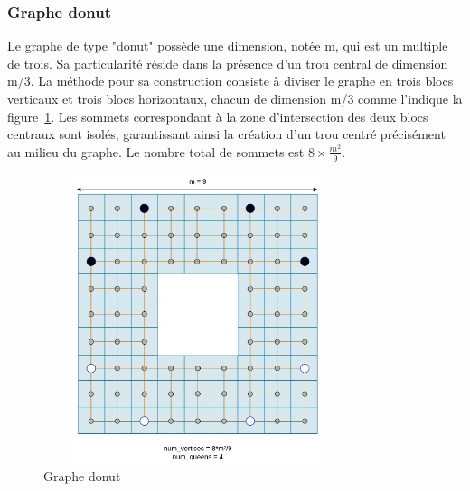 \documentclass[11pt]{article}
\begin{document}
            \subsubsection{Graphe donut}
            Le graphe de type "donut" possède une dimension, notée m, qui est un multiple de trois. Sa particularité réside dans la présence d'un trou central de dimension m/3. La méthode pour sa construction consiste à diviser le graphe en trois blocs verticaux et trois blocs horizontaux, chacun de dimension m/3 comme l'indique la figure~\ref{fig:graphd}. Les sommets correspondant à la zone d'intersection des deux blocs centraux sont isolés, garantissant ainsi la création d'un trou centré précisément au milieu du graphe. Le nombre total de sommets est $8\times \frac{m^{2}}{9}$.
            \begin{figure}[h]
                \centering
                \includegraphics[width = 9cm, height = 8.5cm]{graphe_donut (1).jpg}
                \caption{Graphe donut}
                \label{fig:graphd}
            \end{figure}
\end{document}
